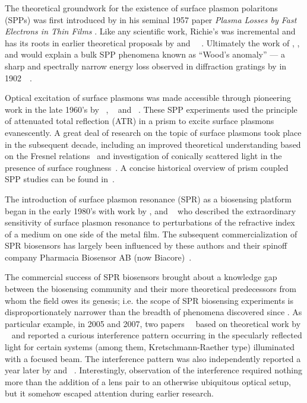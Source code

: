 The theoretical groundwork for the existence of surface plasmon polaritons
(SPPs) was first introduced by  in his seminal 1957 paper
\textit{Plasma Losses by Fast Electrons in Thin Films}
\cite{ritchie1957plasma}.  Like any scientific work, Richie's was
incremental and has its roots in earlier theoretical proposals by
 and
~\cite{bohm1951collective}~\cite{pines1952collective}.
Ultimately the work of , , and  would
explain a bulk SPP phenomena known as ``Wood's anomaly'' --- a sharp and
spectrally narrow energy loss observed in diffraction gratings by
 in
1902~\cite{wood1902remarkable}~\cite{rayleigh1907remarkable}.

Optical excitation of surface plasmons was made accessible through
pioneering work in the late 1960's by
~\cite{kretschmann1968},
~\cite{raether1988springer} and
~\cite{otto1968excitation}.  These SPP experiments used the
principle of attenuated total reflection (ATR) in a prism to excite surface
plasmons evanescently.  A great deal of research on the topic of surface
plasmons took place in the subsequent decade, including an improved
theoretical understanding based on the Fresnel
relations~\cite{chen1976excitation} and investigation of conically scattered
light in the presence of surface roughness~\cite{simon1976directional}.  A
concise historical overview of prism coupled SPP studies can be found
in~\cite{raether1997surface}.

The introduction of surface plasmon resonance (SPR) as a biosensing platform
began in the early 1980's with work by ,  and
~\cite{liedberg1983surface} who described the extraordinary
sensitivity of surface plasmon resonance to perturbations of the refractive
index of a medium on one side of the metal film.  The subsequent
commercialization of SPR biosensors has largely been influenced by these
authors and their spinoff company Pharmacia Biosensor AB (now
Biacore)~\cite{liedberg1995biosensing}.

The commercial success of SPR biosensors brought about a knowledge gap between
the biosensing community and their more theoretical predecessors from whom the
field owes its genesis; i.e\@. the scope of SPR biosensing experiments is
disproportionately narrower than the breadth of phenomena discovered since
.  As particular example, in 2005 and 2007, two
papers~\cite{andaloro2005optical}~\cite{simon2007observation} based on
theoretical work by ~\cite{chuang1986lateral} and 
\cite{chen1976excitation} reported a curious interference pattern occurring in
the specularly reflected light for certain systems (among them,
Kretschmann-Raether type) illuminated with a focused beam.  The interference
pattern was also independently reported a year later by  and
~\cite{schumann2008near}.  Interestingly, observation of the
interference required nothing more than the addition of a lens pair to an
otherwise ubiquitous optical setup, but it somehow escaped attention during
earlier research.  

